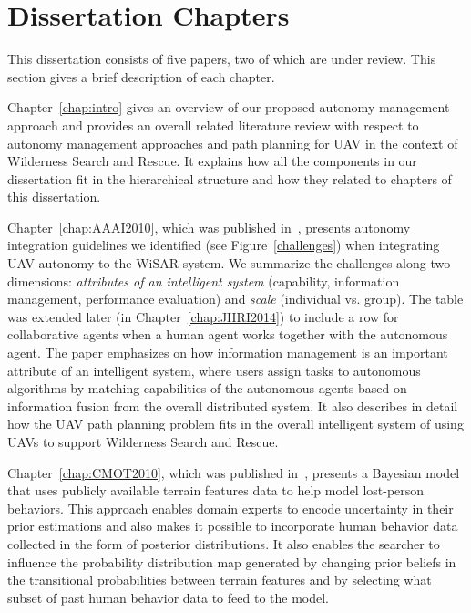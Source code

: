 \section{Dissertation Chapters}

This dissertation consists of five papers, two of which are under review. This section gives a brief description of each chapter.

Chapter~\ref{chap:intro} gives an overview of our proposed autonomy management approach and provides an overall related literature review with respect to autonomy management approaches and path planning for UAV in the context of Wilderness Search and Rescue. It explains how all the components in our dissertation fit in the hierarchical structure and how they related to chapters of this dissertation.

Chapter~\ref{chap:AAAI2010}, which was published in~\cite{Lin2010Supporting}, presents autonomy integration guidelines we identified (see Figure~\ref{challenges}) when integrating UAV autonomy to the WiSAR system. We summarize the challenges along two dimensions: \textit{attributes of an intelligent system} (capability, information management, performance evaluation) and \textit{scale} (individual vs. group). The table was extended later (in Chapter~\ref{chap:JHRI2014}) to include a row for collaborative agents when a human agent works together with the autonomous agent. The paper emphasizes on how information management is an important attribute of an intelligent system, where users assign tasks to autonomous algorithms by matching capabilities of the autonomous agents based on information fusion from the overall distributed system. It also describes in detail how the UAV path planning problem fits in the overall intelligent system of using UAVs to support Wilderness Search and Rescue.

Chapter~\ref{chap:CMOT2010}, which was published in~\cite{Lin2010Bayesian}, presents a Bayesian model that uses publicly available terrain features data to help model lost-person behaviors. This approach enables domain experts to encode uncertainty in their prior estimations and also makes it possible to incorporate human behavior data collected in the form of posterior distributions. It also enables the searcher to influence the probability distribution map generated by changing prior beliefs in the transitional probabilities between terrain features and by selecting what subset of past human behavior data to feed to the model.

